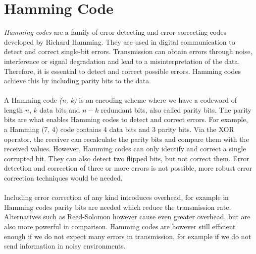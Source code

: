 \section{Hamming Code}
\textit{Hamming codes} are a family of error-detecting and error-correcting codes developed by Richard Hamming. They are used in digital communication to detect and correct single-bit errors. Transmission can obtain errors through noise, interference or signal degradation and lead to a misinterpretation of the data. Therefore, it is essential to detect and correct possible errors. Hamming codes achieve this by including parity bits to the data.
\\ \\
A Hamming code \textit{(n, k)} is an encoding scheme where we have a codeword of length $n$, $k$ data bits and $n-k$ redundant bits, also called parity bits. The parity bits are what enables Hamming codes to detect and correct errors. For example, a Hamming (7, 4) code contains 4 data bits and 3 parity bits. Via the XOR operator, the receiver can recalculate the parity bits and compare them with the received values. However, Hamming codes can only identify and correct a single corrupted bit. They can also detect two flipped bits, but not correct them. Error detection and correction of three or more errors is not possible, more robust error correction techniques would be needed. 
\\ \\
Including error correction of any kind introduces overhead, for example in Hamming codes parity bits are needed which reduce the transmission rate. Alternatives such as Reed-Solomon however cause even greater overhead, but are also more powerful in comparison. Hamming codes are however still efficient enough if we do not expect many errors in transmission, for example if we do not send information in noisy environments.